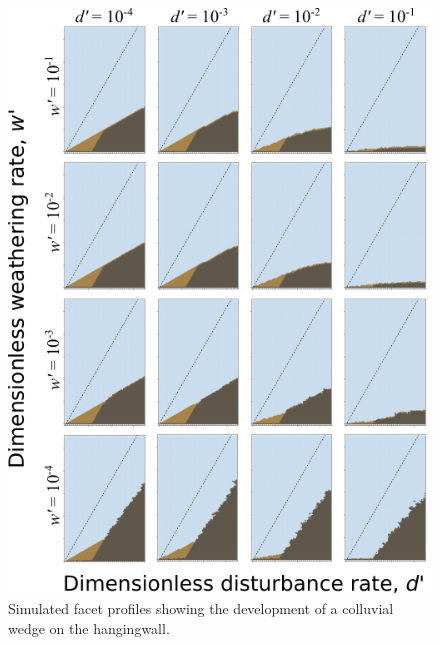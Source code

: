 \begin{figure}[ht!]
\centerline{\includegraphics{Figures/four_by_four_profiles_colluvial_wedge.pdf}}
\caption{Simulated facet profiles showing the development of a colluvial wedge on the hangingwall.}
\label{fig:colluv}
\end{figure}

